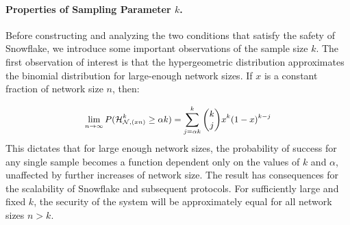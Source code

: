 \documentclass[letterpaper,twocolumn,10pt]{article}
\newtheorem{lemma}[theorem]{Lemma}
\theoremstyle{definition}
\begin{document}
\begin{appendices}
\paragraph{Properties of Sampling Parameter $k$.} Before constructing and analyzing the two conditions that satisfy the safety of Snowflake, we introduce some important observations of the sample size $k$. 
The first observation of interest is that the hypergeometric distribution approximates the binomial distribution for large-enough network sizes.
If $x$ is a constant fraction of network size $n$, then:

\begin{equation}
    \small
    \begin{split}
        \lim_{n \rightarrow \infty} P(\mathcal{H}_{\mathcal{N}, (xn)}^k \geq \alpha k) = \sum_{j=\alpha k}^k {k \choose j}x^k (1 - x)^{k - j}
    \end{split}
\end{equation}
\noindent This dictates that for large enough network sizes, the probability of success for any single sample becomes a function dependent only on the values of $k$ and $\alpha$, unaffected by further increases of network size. 
The result has consequences for the scalability of Snowflake and subsequent protocols. For sufficiently large and fixed $k$, the security of the system will be approximately equal for all network sizes $n > k$.

\end{appendices}
\end{document}
